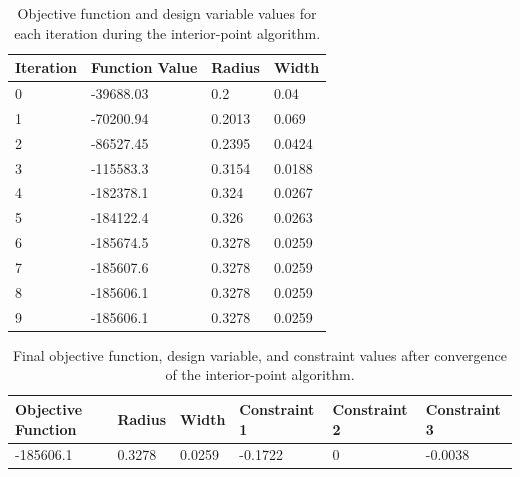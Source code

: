 \documentclass[11pt]{article}
\begin{document}
\begin{solution}
\begin{table}[htbp]
	\centering
    \begin{tabular}{|l|l|l|l|}
        \hline
       Iteration & Function Value & Radius & Width\\ \hline
0 & -39688.03 & 0.2 & 0.04\\ 
1 & -70200.94 & 0.2013 & 0.069\\ 
2 & -86527.45 & 0.2395 & 0.0424\\ 
3 & -115583.3 & 0.3154 & 0.0188\\ 
4 & -182378.1 & 0.324 & 0.0267\\ 
5 & -184122.4 & 0.326 & 0.0263\\ 
6 & -185674.5 & 0.3278 & 0.0259\\ 
7 & -185607.6 & 0.3278 & 0.0259\\ 
8 & -185606.1 & 0.3278 & 0.0259\\ 
9 & -185606.1 & 0.3278 & 0.0259\\ 
        \hline
    \end{tabular}
	\caption{Objective function and design variable values for each iteration during the interior-point algorithm.}
	\label{Table3}
\end{table}

\begin{table}[htbp]
	\centering
    \begin{tabular}{|l|l|l|l|l|l|}
        \hline
	Objective Function & Radius & Width & Constraint 1 & Constraint 2 & Constraint 3 \\ \hline
	-185606.1 & 0.3278 & 0.0259 & -0.1722 & 0 & -0.0038 \\ 
	\hline
    \end{tabular}
	\caption{Final objective function, design variable, and constraint values after convergence of the interior-point algorithm.}
	\label{Table4}
\end{table}

\end{solution}
\end{document}
